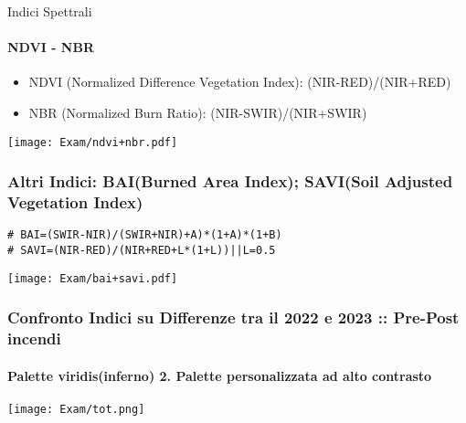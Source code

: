 \documentclass{beamer}  %
\begin{document}
\begin{frame}[fragile]{Indici Spettrali}
    \framesubtitle{NDVI - NBR}
 \begin{itemize}
        \item \scriptsize NDVI (Normalized Difference Vegetation Index): (NIR-RED)/(NIR+RED)
        \item NBR (Normalized Burn Ratio): (NIR-SWIR)/(NIR+SWIR)
\end{itemize}
            \begin{center} 
        \texttt{[image: Exam/ndvi+nbr.pdf]}
    \end{center}
\end{frame}

\begin{frame}[fragile]
\frametitle{\scriptsize Altri Indici: BAI(Burned Area Index); SAVI(Soil Adjusted Vegetation Index)}
           \begin{lstlisting}[style=mystyle]
# BAI=(SWIR-NIR)/(SWIR+NIR)+A)*(1+A)*(1+B)
# SAVI=(NIR-RED)/(NIR+RED+L*(1+L))||L=0.5
            \end{lstlisting}
       \begin{center}
\texttt{[image: Exam/bai+savi.pdf]}  
       \end{center}
\end{frame}

\begin{frame}[fragile]
\frametitle{\scriptsize Confronto Indici su Differenze tra il 2022 e 2023 :: Pre-Post incendi}
\framesubtitle{\tiny Palette viridis(inferno) 2. Palette personalizzata ad alto contrasto}
\texttt{[image: Exam/tot.png]} 
\end{frame}
\end{document}
